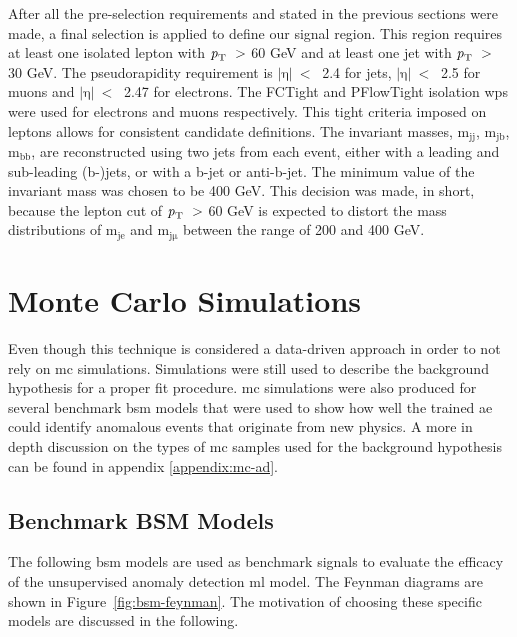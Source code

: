 After all the pre-selection requirements and stated in the previous sections were made, a final selection is applied to define our signal region. This region requires at least one 
isolated lepton with $\textrm{\textit{p}}_{\textrm{T}} \ >$ 60 GeV and at least one jet with $\textrm{\textit{p}}_{\textrm{T}} \ >$ 30 GeV. The pseudorapidity requirement is $|\textrm{η}|\ < \ $ 2.4 for jets, 
$|\textrm{η}|\ < \ $ 2.5 for muons and $|\textrm{η}|\ < \ $ 2.47 for electrons. The FCTight and PFlowTight isolation \gls{wp}s were used for electrons and muons respectively. This tight 
criteria imposed on leptons allows for consistent candidate definitions. The invariant masses, $\textrm{m}_{\textrm{jj}}$, $\textrm{m}_{\textrm{jb}}$, $\textrm{m}_{\textrm{bb}}$, are reconstructed 
using two jets from each event, either with a leading and sub-leading (b-)jets, or with a b-jet or anti-b-jet. The minimum value of the invariant mass was chosen to be 400 GeV. This decision 
was made, in short, because the lepton cut of $\textrm{\textit{p}}_{\textrm{T}} \ >$ 60 GeV is expected to distort the mass distributions of $\textrm{m}_{\textrm{je}}$ and $\textrm{m}_{\textrm{jμ}}$ 
between the range of 200 and 400 GeV. 

\section{Monte Carlo Simulations}

Even though this technique is considered a data-driven approach in order to not rely on \gls{mc} simulations. Simulations were still used to describe the background hypothesis for a proper 
fit procedure. \gls{mc} simulations were also produced for several benchmark \gls{bsm} models that were used to show how well the trained \gls{ae} could identify anomalous events that originate 
from new physics. A more in depth discussion on the types of \gls{mc} samples used for the background hypothesis can be found in appendix \ref{appendix:mc-ad}.

\subsection{Benchmark BSM Models}

The following \gls{bsm} models are used as benchmark signals to evaluate the efficacy of the unsupervised anomaly detection \gls{ml} model. The Feynman diagrams are shown in Figure~\ref{fig:bsm-feynman}. The motivation
of choosing these specific models are discussed in the following. 

